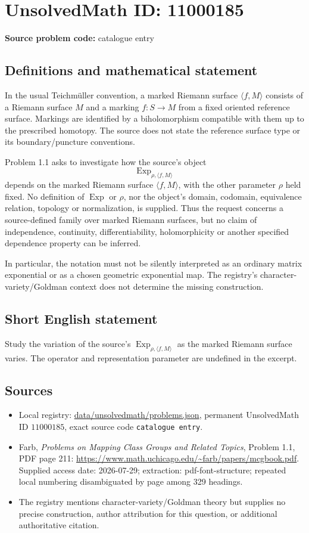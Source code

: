 \documentclass[11pt]{article}
\begin{document}
\section*{UnsolvedMath ID: 11000185}
\textbf{Source problem code:} catalogue entry
\subsection{Definitions and mathematical statement}
In the usual Teichm\"uller convention, a marked Riemann surface $\langle f,M\rangle$ consists of a Riemann surface $M$ and a marking $f:S\to M$ from a fixed oriented reference surface. Markings are identified by a biholomorphism compatible with them up to the prescribed homotopy. The source does not state the reference surface type or its boundary/puncture conventions.

Problem 1.1 asks to investigate how the source's object
\[
 \operatorname{Exp}_{\rho,\langle f,M\rangle}
\]
depends on the marked Riemann surface $\langle f,M\rangle$, with the other parameter $\rho$ held fixed. No definition of $\operatorname{Exp}$ or $\rho$, nor the object's domain, codomain, equivalence relation, topology or normalization, is supplied. Thus the request concerns a source-defined family over marked Riemann surfaces, but no claim of independence, continuity, differentiability, holomorphicity or another specified dependence property can be inferred.

In particular, the notation must not be silently interpreted as an ordinary matrix exponential or as a chosen geometric exponential map. The registry's character-variety/Goldman context does not determine the missing construction.
\subsection{Short English statement}
Study the variation of the source's $\operatorname{Exp}_{\rho,\langle f,M\rangle}$ as the marked Riemann surface varies. The operator and representation parameter are undefined in the excerpt.
\subsection{Sources}
\begin{itemize}
\item Local registry: \url{data/unsolvedmath/problems.json}, permanent UnsolvedMath ID $11000185$, exact source code \texttt{catalogue entry}.
\item Farb, \emph{Problems on Mapping Class Groups and Related Topics}, Problem 1.1, PDF page 211: \url{https://www.math.uchicago.edu/~farb/papers/mcgbook.pdf}. Supplied access date: 2026-07-29; extraction: pdf-font-structure; repeated local numbering disambiguated by page among 329 headings.
\item The registry mentions character-variety/Goldman theory but supplies no precise construction, author attribution for this question, or additional authoritative citation.
\end{itemize}
\end{document}
